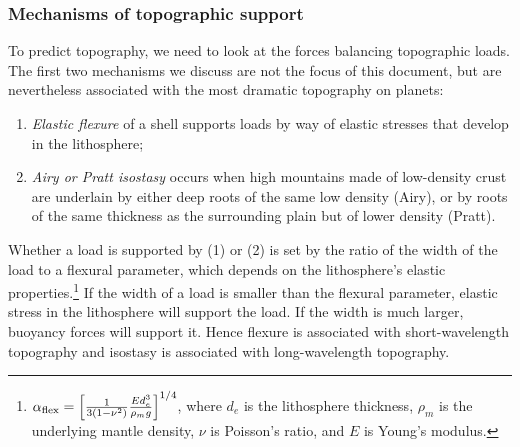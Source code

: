 \subsubsection{Mechanisms of topographic support}\label{sec:top_mechs}


To predict topography, we need to look at the forces balancing topographic loads. The first two mechanisms we discuss are not the focus of this document, but are nevertheless associated with the most dramatic topography on planets:
\begin{enumerate}
\item \emph{Elastic flexure} of a shell supports loads by way of elastic stresses that develop in the lithosphere;
\item \emph{Airy or Pratt isostasy} occurs when high mountains made of low-density crust are underlain by either deep roots of the same low density (Airy), or by roots of the same thickness as the surrounding plain but of lower density (Pratt).
\end{enumerate}
Whether a load is supported by (1) or (2) is set by the ratio of the width of the load to a flexural parameter, which depends on the lithosphere's elastic properties.\footnote{$\alpha_{\rm flex} = \left[\frac{1}{3(1 - \nu^2)}\frac{Ed_e^3}{\rho_m g}\right]^{1/4}$, where $d_e$ is the lithosphere thickness, $\rho_m$ is the underlying mantle density, $\nu$ is Poisson's ratio, and $E$ is Young's modulus.}
If the width of a load is smaller than the flexural parameter, elastic stress in the lithosphere will support the load. If the width is much larger, buoyancy forces will support it. Hence flexure is associated with short-wavelength topography and isostasy is associated with long-wavelength topography. 

